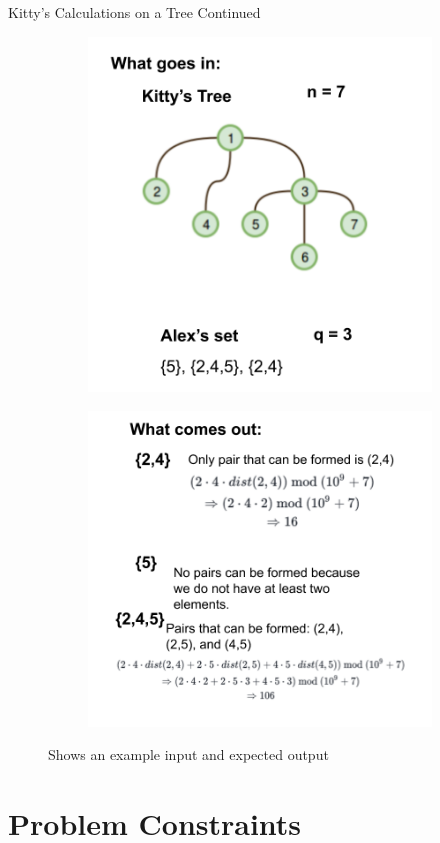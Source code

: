 \documentclass{beamer}
\begin{document}
\begin{frame}{Kitty's Calculations on a Tree Continued}
\begin{figure}
\begin{subfigure}{ }
\includegraphics[scale=.3]{Kittycalc.png} 
\end{subfigure}
\begin{subfigure}{ }
\includegraphics[scale=.3]{Kittycalcbottom.png}
\end{subfigure}
\caption{Shows an example input and expected output}
\label{fig:image2}
\end{figure}
\end{frame}

\section{Problem Constraints}
\end{document}
